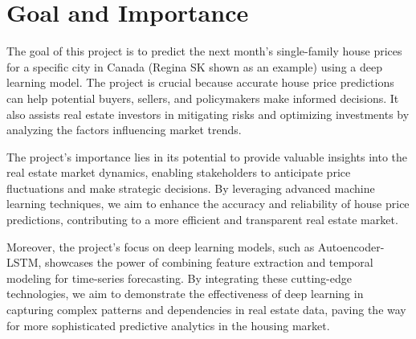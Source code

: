 \section{Goal and Importance}
The goal of this project is to predict the next month's single-family house prices for a specific city in Canada (Regina SK shown as an example) using a deep learning model. The project is crucial because accurate house price predictions can help potential buyers, sellers, and policymakers make informed decisions. It also assists real estate investors in mitigating risks and optimizing investments by analyzing the factors influencing market trends.

The project's importance lies in its potential to provide valuable insights into the real estate market dynamics, enabling stakeholders to anticipate price fluctuations and make strategic decisions. By leveraging advanced machine learning techniques, we aim to enhance the accuracy and reliability of house price predictions, contributing to a more efficient and transparent real estate market.

Moreover, the project's focus on deep learning models, such as Autoencoder-LSTM, showcases the power of combining feature extraction and temporal modeling for time-series forecasting. By integrating these cutting-edge technologies, we aim to demonstrate the effectiveness of deep learning in capturing complex patterns and dependencies in real estate data, paving the way for more sophisticated predictive analytics in the housing market.
